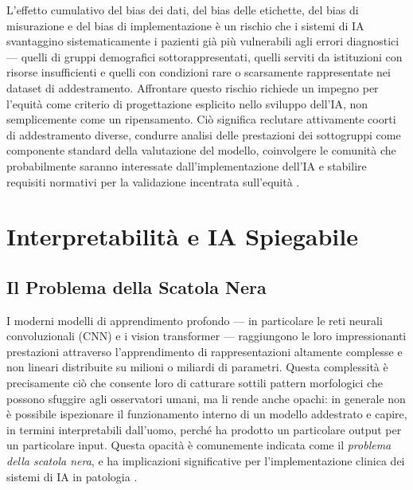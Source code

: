 L'effetto cumulativo del bias dei dati, del bias delle etichette, del bias di misurazione e del bias di implementazione è un rischio che i sistemi di IA svantaggino sistematicamente i pazienti già più vulnerabili agli errori diagnostici — quelli di gruppi demografici sottorappresentati, quelli serviti da istituzioni con risorse insufficienti e quelli con condizioni rare o scarsamente rappresentate nei dataset di addestramento. Affrontare questo rischio richiede un impegno per l'equità come criterio di progettazione esplicito nello sviluppo dell'IA, non semplicemente come un ripensamento. Ciò significa reclutare attivamente coorti di addestramento diverse, condurre analisi delle prestazioni dei sottogruppi come componente standard della valutazione del modello, coinvolgere le comunità che probabilmente saranno interessate dall'implementazione dell'IA e stabilire requisiti normativi per la validazione incentrata sull'equità \cite{chen2023}.

\section{Interpretabilità e IA Spiegabile}
\label{sec:ch5_xai}

\subsection{Il Problema della Scatola Nera}

I moderni modelli di apprendimento profondo — in particolare le reti neurali convoluzionali (CNN) e i vision transformer — raggiungono le loro impressionanti prestazioni attraverso l'apprendimento di rappresentazioni altamente complesse e non lineari distribuite su milioni o miliardi di parametri. Questa complessità è precisamente ciò che consente loro di catturare sottili pattern morfologici che possono sfuggire agli osservatori umani, ma li rende anche opachi: in generale non è possibile ispezionare il funzionamento interno di un modello addestrato e capire, in termini interpretabili dall'uomo, perché ha prodotto un particolare output per un particolare input. Questa opacità è comunemente indicata come il \emph{problema della scatola nera}, e ha implicazioni significative per l'implementazione clinica dei sistemi di IA in patologia \cite{amann2020}.

